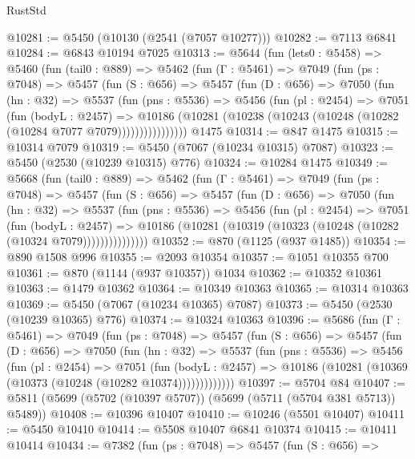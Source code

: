 \begin{lexlean}{RustStd}
\begin{coremodule}
@10281 := @5450 (@10130 (@2541 (@7057 @10277)))
@10282 := @7113 @6841
@10284 := @6843 @10194 @7025
@10313 := @5644
    (fun (lets0 : @5458) =>
    @5460
      (fun (tail0 : @889) =>
      @5462
        (fun (Γ : @5461) =>
        @7049
          (fun (ps : @7048) =>
          @5457
            (fun (S : @656) =>
            @5457
              (fun (D : @656) =>
              @7050
                (fun (hn : @32) =>
                @5537
                  (fun (pns : @5536) =>
                  @5456
                    (fun (pl : @2454) =>
                    @7051
                      (fun (bodyL : @2457) =>
                      @10186
                        (@10281 (@10238 (@10243 (@10248 (@10282 (@10284 @7077 @7079))))))))))))))))
    @1475
@10314 := @847 @1475
@10315 := @10314 @7079
@10319 := @5450 (@7067 (@10234 @10315) @7087)
@10323 := @5450 (@2530 (@10239 @10315) @776)
@10324 := @10284 @1475
@10349 := @5668
    (fun (tail0 : @889) =>
    @5462
      (fun (Γ : @5461) =>
      @7049
        (fun (ps : @7048) =>
        @5457
          (fun (S : @656) =>
          @5457
            (fun (D : @656) =>
            @7050
              (fun (hn : @32) =>
              @5537
                (fun (pns : @5536) =>
                @5456
                  (fun (pl : @2454) =>
                  @7051
                    (fun (bodyL : @2457) =>
                    @10186 (@10281 (@10319 (@10323 (@10248 (@10282 (@10324 @7079)))))))))))))))
@10352 := @870 (@1125 (@937 @1485))
@10354 := @890 @1508 @996
@10355 := @2093 @10354
@10357 := @1051 @10355 @700
@10361 := @870 (@1144 (@937 @10357)) @1034
@10362 := @10352 @10361
@10363 := @1479 @10362
@10364 := @10349 @10363
@10365 := @10314 @10363
@10369 := @5450 (@7067 (@10234 @10365) @7087)
@10373 := @5450 (@2530 (@10239 @10365) @776)
@10374 := @10324 @10363
@10396 := @5686
    (fun (Γ : @5461) =>
    @7049
      (fun (ps : @7048) =>
      @5457
        (fun (S : @656) =>
        @5457
          (fun (D : @656) =>
          @7050
            (fun (hn : @32) =>
            @5537
              (fun (pns : @5536) =>
              @5456
                (fun (pl : @2454) =>
                @7051
                  (fun (bodyL : @2457) =>
                  @10186 (@10281 (@10369 (@10373 (@10248 (@10282 @10374)))))))))))))
@10397 := @5704 @84
@10407 := @5811 (@5699 (@5702 (@10397 @5707)) (@5699 (@5711 (@5704 @381 @5713)) @5489))
@10408 := @10396 @10407
@10410 := @10246 (@5501 @10407)
@10411 := @5450 @10410
@10414 := @5508 @10407 @6841 @10374
@10415 := @10411 @10414
@10434 := @7382
    (fun (ps : @7048) =>
    @5457
      (fun (S : @656) =>

\end{coremodule}
\end{lexlean}
